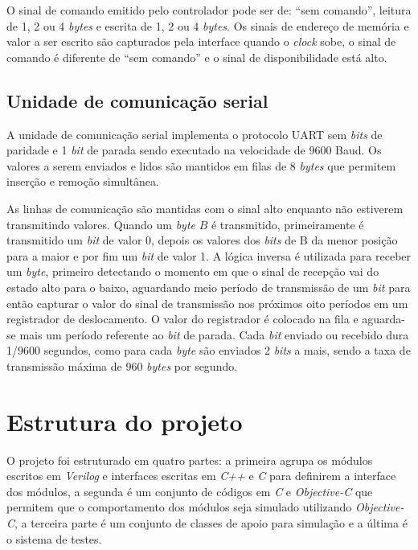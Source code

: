 O sinal de comando emitido pelo controlador pode ser de: ``sem comando'', leitura de 1, 2 ou 4 \emph{bytes} e
escrita de 1, 2 ou 4 \emph{bytes}. Os sinais de endereço de memória e valor a ser escrito são capturados
pela interface quando o \emph{clock} sobe, o sinal de comando é diferente de ``sem comando'' e o sinal
de disponibilidade está alto.

\subsection{Unidade de comunicação serial}
\label{ssec:serial}

A unidade de comunicação serial implementa o protocolo UART sem \emph{bits} de paridade e 1 
\emph{bit} de parada sendo executado na velocidade de 9600 Baud. Os valores a serem
enviados e lidos são mantidos em filas de 8 \emph{bytes} que permitem inserção e remoção simultânea.

As linhas de comunicação são mantidas com o sinal alto enquanto não estiverem transmitindo valores.
Quando um \emph{byte} $B$ é transmitido, primeiramente é transmitido um \emph{bit} de valor 0, depois
os valores dos \emph{bits} de B da menor posição para a maior e por fim um \emph{bit} de valor 1.
A lógica inversa é utilizada para receber um \emph{byte}, primeiro detectando o momento em que o 
sinal de recepção vai do estado alto para o baixo, aguardando meio período de transmissão de um \emph{bit} 
para então capturar
o valor do sinal de transmissão nos próximos oito períodos em um registrador de deslocamento. O valor
do registrador é colocado na fila e aguarda-se mais um período referente ao \emph{bit} de parada.
Cada \emph{bit} enviado ou recebido dura 1/9600 segundos, como para cada \emph{byte} são enviados
2 \emph{bits} a mais, sendo a taxa de transmissão máxima de 960 \emph{bytes} por segundo.

\section{Estrutura do projeto}
\label{sec:edp}

O projeto foi estruturado em quatro partes: a primeira agrupa os módulos escritos em \emph{Verilog}
e interfaces escritas em \emph{C++} e \emph{C} para definirem a interface dos módulos, a
segunda é um conjunto de códigos em \emph{C} e \emph{Objective-C} que permitem que
o comportamento dos módulos seja simulado utilizando \emph{Objective-C}, a terceira parte é um conjunto
de classes de apoio para simulação e a última é o sistema de testes.

